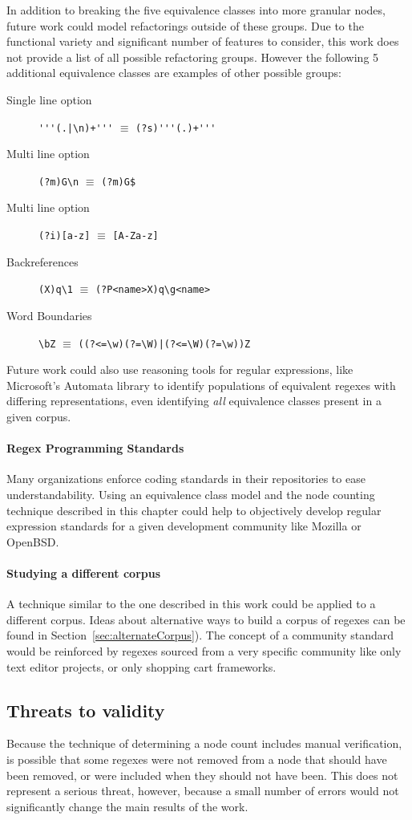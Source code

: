 In addition to breaking the five equivalence classes into more granular nodes, future work could model refactorings outside of these groups. Due to the functional variety and significant number of features to consider, this work does not provide a list of all possible refactoring groups.  However the following 5 additional equivalence classes are examples of other possible groups:
\begin{description}
\item[Single line option]  \verb!'''(.|\n)+'''! $\equiv$ \verb!(?s)'''(.)+'''!
\item[Multi line option]  \verb!(?m)G\n! $\equiv$ \verb!(?m)G$!
\item[Multi line option]  \verb!(?i)[a-z]! $\equiv$ \verb![A-Za-z]!
\item[Backreferences]  \verb!(X)q\1! $\equiv$ \verb!(?P<name>X)q\g<name>!
\item[Word Boundaries]  \verb!\bZ! $\equiv$ \verb!((?<=\w)(?=\W)|(?<=\W)(?=\w))Z!
\end{description}

Future work could also use reasoning tools for regular expressions, like Microsoft's Automata library to identify populations of equivalent regexes with differing representations, even identifying \emph{all} equivalence classes present in a given corpus.

\paragraph{Regex Programming Standards}
Many organizations enforce coding standards in their repositories to ease understandability.  Using an equivalence class model and the node counting technique described in this chapter could help to objectively develop regular expression standards for a given development community like Mozilla or OpenBSD.

\paragraph{Studying a different corpus}
A technique similar to the one described in this work could be applied to a different corpus.  Ideas about alternative ways to build a corpus of regexes can be found in Section~\ref{sec:alternateCorpus}).  The concept of a community standard would be reinforced by regexes sourced from a very specific community like only text editor projects, or only shopping cart frameworks.

\subsection{Threats to validity}
Because the technique of determining a node count includes manual verification, is possible that some regexes were not removed from a node that should have been removed, or were included when they should not have been.  This does not represent a serious threat, however, because a small number of errors would not significantly change the main results of the work.

